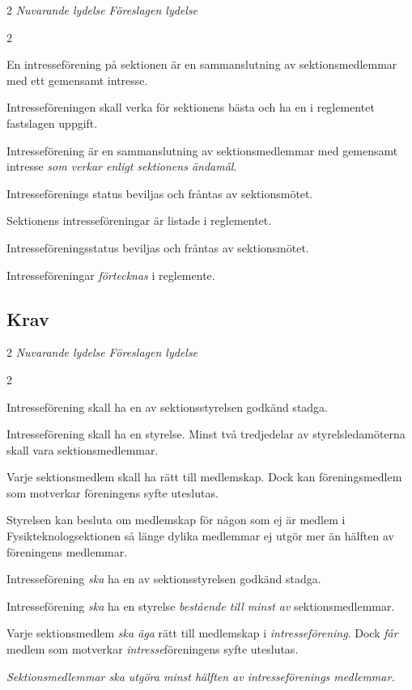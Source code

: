\documentclass{article}
\newenvironment{lydelse}
    {\begin{paracol}{2}%
        \emph{Nuvarande lydelse}%
        \switchcolumn%
        \emph{Föreslagen lydelse}%
    \end{paracol}%
    \begin{enumerate}[label=\thesubsection.\arabic*]%
    \begin{paracol}{2}%
    }{\end{paracol}\end{enumerate}}
\begin{document}
\begin{lydelse}
  \setcounter{section}{12}
  \setcounter{subsection}{1}
  \item En intresseförening på sektionen är en sammanslutning av sektionsmedlemmar med ett gemensamt intresse.
  \item Intresseföreningen skall verka för sektionens bästa och ha en i reglementet fastslagen uppgift.
\switchcolumn
  \setcounter{section}{11}
  \item Intresseförening är en sammanslutning av sektionsmedlemmar med gemensamt intresse \emph{som verkar enligt sektionens ändamål}.
\switchcolumn*
  \setcounter{subsection}{3}
  \setcounter{enumi}{0}
  \item Intresseförenings status beviljas och fråntas av sektionsmötet.
  
  \setcounter{subsection}{8}
  \setcounter{enumi}{0}
  \item Sektionens intresseföreningar är listade i reglementet.
\switchcolumn
  \item Intresseföreningsstatus beviljas och fråntas av sektionsmötet.
  \item Intresseföreningar \emph{förtecknas} i reglemente.
\end{lydelse}
\setcounter{section}{11}
\setcounter{subsection}{0}

\subsection{Krav}
\begin{lydelse}
  \setcounter{section}{12}
  \setcounter{subsection}{2}
  \item Intresseförening skall ha en av sektionsstyrelsen godkänd stadga.
  \item Intresseförening skall ha en styrelse. Minst två tredjedelar av styrelsledamöterna skall vara sektionsmedlemmar.
  \setcounter{subsection}{7}
  \item Varje sektionsmedlem skall ha rätt till medlemskap. Dock kan föreningsmedlem som motverkar föreningens syfte uteslutas.
  \item Styrelsen kan besluta om medlemskap för någon som ej är medlem i Fysikteknologsektionen så länge dylika medlemmar ej utgör mer än hälften av föreningens medlemmar.
  \switchcolumn
  \setcounter{section}{11}
  \item Intresseförening \emph{ska} ha en av sektionsstyrelsen godkänd stadga.
  \item Intresseförening \emph{ska} ha en styrelse \emph{bestående till minst  av} sektionsmedlemmar.
  \item Varje sektionsmedlem \emph{ska äga} rätt till medlemskap i \emph{intresseförening}.
    Dock \emph{får} medlem som motverkar \emph{intresse}föreningens syfte uteslutas.
  \item \emph{Sektionsmedlemmar ska utgöra minst hälften av intresseförenings medlemmar.}
\end{lydelse}
\setcounter{section}{11}
\setcounter{subsection}{1}
\end{document}
